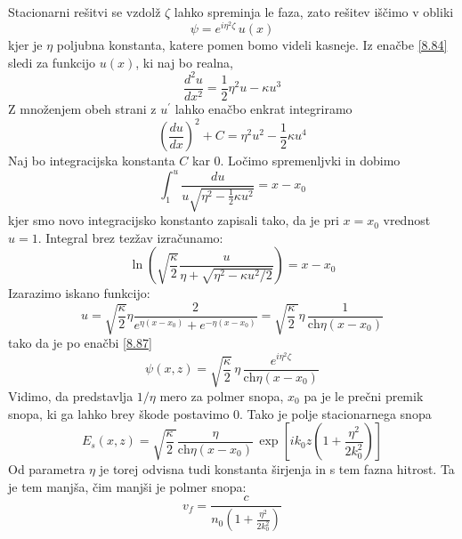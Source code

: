 Stacionarni rešitvi se vzdolž $\zeta$ lahko spreminja le faza, zato
rešitev iščimo v obliki 
\begin{equation}
\psi=e^{i\eta^{2}\zeta}\, u(x)\label{8.87}
\end{equation}
 kjer je $\eta$ poljubna konstanta, katere pomen bomo videli kasneje.
Iz enačbe \ref{8.84} sledi za funkcijo $u(x)$, ki naj bo realna,
\begin{equation}
\frac{d^{2}u}{dx^{2}}=\frac{1}{2}\eta^{2}u-\kappa u^{3}
\end{equation}
 Z množenjem obeh strani z $u^{\prime}$ lahko enačbo enkrat integriramo
\begin{equation}
\left(\frac{du}{dx}\right)^{2}+C=\eta^{2}u^{2}-\frac{1}{2}\kappa u^{4}
\end{equation}
 Naj bo integracijska konstanta $C$ kar 0. Ločimo spremenljvki in
dobimo 
\begin{equation}
\int_{1}^{u}\frac{du}{u\sqrt{\eta^{2}-\frac{1}{2}\kappa u^{2}}}=x-x_{0}\label{8.85}
\end{equation}
 kjer smo novo integracijsko konstanto zapisali tako, da je pri $x=x_{0}$
vrednost $u=1$. Integral brez tezžav izračunamo: 
\begin{equation}
\ln\left(\sqrt{\frac{\kappa}{2}}\frac{u}{\eta+\sqrt{\eta^{2}-\kappa u^{2}/2}}\right)=x-x_{0}
\end{equation}
 Izarazimo iskano funkcijo: 
\begin{equation}
u=\sqrt{\frac{\kappa}{2}}\eta\frac{2}{e^{\eta(x-x_{0})}+e^{-\eta(x-x_{0})}}=\sqrt{\frac{\kappa}{2}\,}\eta\,\frac{1}{\text{ch}\eta(x-x_{0})}\label{8.86}
\end{equation}
 tako da je po enačbi \ref{8.87} 
\begin{equation}
\psi(x,z)=\sqrt{\frac{\kappa}{2}}\,\eta\,\frac{e^{i\eta^{2}\zeta}}{\text{ch}\eta(x-x_{0})}\label{8.88}
\end{equation}
 Vidimo, da predstavlja $1/\eta$ mero za polmer snopa, $x_{0}$ pa
je le prečni premik snopa, ki ga lahko brey škode postavimo 0. Tako
je polje stacionarnega snopa 
\begin{equation}
E_{s}(x,z)=\sqrt{\frac{\kappa}{2}\,}\frac{\eta}{\text{ch}\eta(x-x_{0})}\,\exp[ik_{0}z(1+\frac{\eta^{2}}{2k_{0}^{2}})]\label{8.89}
\end{equation}
 Od parametra $\eta$ je torej odvisna tudi konstanta širjenja in
s tem fazna hitrost. Ta je tem manjša, čim manjši je polmer snopa:
\begin{equation}
v_{f}=\frac{c}{n_{0}(1+\frac{\eta^{2}}{2k_{0}^{2}})}
\end{equation}


